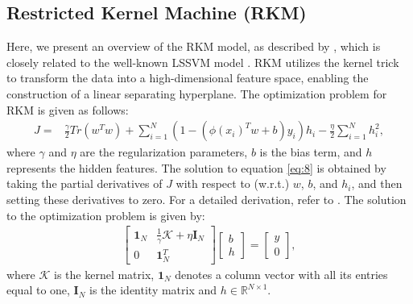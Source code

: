 \subsection{Restricted Kernel Machine (RKM)}
Here, we present an overview of the RKM model, as described by \citet{suykens2017deep}, which is closely related to the well-known LSSVM model \cite{suykens1999least}. RKM utilizes the kernel trick to transform the data into a high-dimensional feature space, enabling the construction of a linear separating hyperplane. The optimization problem for RKM is given as follows:
\begin{align}
\label{eq:8}
      J = & \frac{\gamma}{2} Tr(w^Tw) + \sum_{i=1}^N (1-(\phi(x_i)^Tw+b)y_i)h_i - \frac{\eta}{2} \sum_{i=1}^Nh_i^2,
\end{align}
where \(\gamma\) and \(\eta\) are the regularization parameters, \(b\) is the bias term, and \(h\) represents the hidden features. The solution to equation \eqref{eq:8} is obtained by taking the partial derivatives of \(J\) with respect to (w.r.t.) \(w\), \(b\), and \(h_i\), and then setting these derivatives to zero. For a detailed derivation, refer to \citet{suykens2017deep}. The solution to the optimization problem is given by:
\begin{align}
    \begin{bmatrix}
\mathbf{1}_N & \frac{1}{\gamma} \mathcal{K} + \eta \mathbf{I}_N \\
0  & \mathbf{1}_N^T
\end{bmatrix}
\begin{bmatrix}
b \\
h
\end{bmatrix}
= 
\begin{bmatrix}
y \\
0
\end{bmatrix},
\end{align}
where $\mathcal{K}$ is the kernel matrix, \(\mathbf{1}_N\) denotes a column vector with all its entries equal to one, $\mathbf{I}_N$ is the identity matrix and $h \in \mathbb{R}^{N \times 1}$.